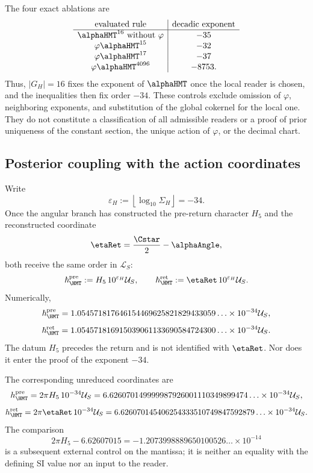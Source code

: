 The four exact ablations are
\[
\begin{array}{c|c}
\text{evaluated rule}&\text{decadic exponent}\\
\hline
\alphaHMT^{16}\ \text{without }\varphi&-35\\
\varphi\alphaHMT^{15}&-32\\
\varphi\alphaHMT^{17}&-37\\
\varphi\alphaHMT^{4096}&-8753.
\end{array}
\]
Thus, \(|G_H|=16\) fixes the exponent of \(\alphaHMT\) once the
local reader is chosen, and the inequalities then fix order \(-34\). These
controls exclude omission of \(\varphi\), neighboring exponents, and
substitution of the global cokernel for the local one. They do not constitute a
classification of all admissible readers or a proof of prior uniqueness
of the constant section, the unique action of \(\varphi\), or the
decimal chart.

\subsection{Posterior coupling with the action coordinates}

Write
\[
\varepsilon_H:=\left\lfloor\log_{10}\Sigma_H\right\rfloor=-34.
\]
Once the angular branch has constructed the pre-return character \(H_5\)
and the reconstructed coordinate
\[
\etaRet=\frac{\Cstar}{2}-\alphaAngle,
\]
both receive the same order in \(\mathcal L_S\):
\[
\hbar_{\HMT}^{\rm pre}
:=H_5\,10^{\varepsilon_H}\mathcal U_S,
\qquad
\hbar_{\HMT}^{\rm ret}
:=\etaRet\,10^{\varepsilon_H}\mathcal U_S.
\]
Numerically,
\[
\hbar_{\HMT}^{\rm pre}
=1.054571817646154469625821829433059\ldots
\times10^{-34}\mathcal U_S,
\]
\[
\hbar_{\HMT}^{\rm ret}
=1.054571816915039061133690584724300\ldots
\times10^{-34}\mathcal U_S.
\]
The datum \(H_5\) precedes the return and is not identified with \(\etaRet\).
Nor does it enter the proof of the exponent \(-34\).

The corresponding unreduced coordinates are
\[
h_{\HMT}^{\rm pre}
=2\pi H_5\,10^{-34}\mathcal U_S
=6.626070149999987926001110349899474\ldots
\times10^{-34}\mathcal U_S,
\]
\[
h_{\HMT}^{\rm ret}
=2\pi\etaRet\,10^{-34}\mathcal U_S
=6.626070145406254333510749847592879\ldots
\times10^{-34}\mathcal U_S.
\]
The comparison
\[
2\pi H_5-6.62607015
=-1.2073998889650100526\ldots\times10^{-14}
\]
is a subsequent external control on the mantissa; it is neither an equality with the
defining SI value nor an input to the reader.

